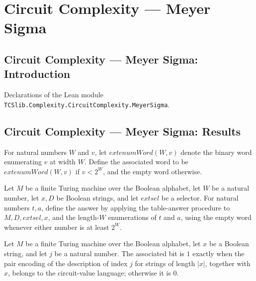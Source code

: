 \section{Circuit Complexity --- Meyer Sigma}
\subsection*{Circuit Complexity --- Meyer Sigma: Introduction}

Declarations of the Lean module \texttt{TCSlib.Complexity.CircuitComplexity.MeyerSigma}.

\subsection*{Circuit Complexity --- Meyer Sigma: Results}

\begin{definition}
\label{Complexity.Meyer.wordOf}
\leanok
{}
For natural numbers $W$ and $v$, let $	ext{enumWord}(W,v)$ denote the binary word
enumerating $v$ at width $W$. Define the associated word to be $	ext{enumWord}(W,v)$ if
$v<2^W$, and the empty word otherwise.
\end{definition}

\begin{definition}
\label{Complexity.Meyer.AnsOf}
\leanok
{}
Let $M$ be a finite Turing machine over the Boolean alphabet, let $W$ be a natural
number, let $x,D$ be Boolean strings, and let $	ext{sel}$ be a selector. For natural
numbers $t,a$, define the answer by applying the table-answer procedure to
$M,D,	ext{sel},x$, and the length-$W$ enumerations of $t$ and $a$, using the empty word
whenever either number is at least $2^W$.
\end{definition}

\begin{definition}
\label{Complexity.Meyer.xbOf}
\leanok
{}
Let $M$ be a finite Turing machine over the Boolean alphabet, let $x$ be a Boolean
string, and let $j$ be a natural number. The associated bit is $1$ exactly when the pair
encoding of the description of index $j$ for strings of length $|x|$, together with $x$,
belongs to the circuit-value language; otherwise it is $0$.
\end{definition}

